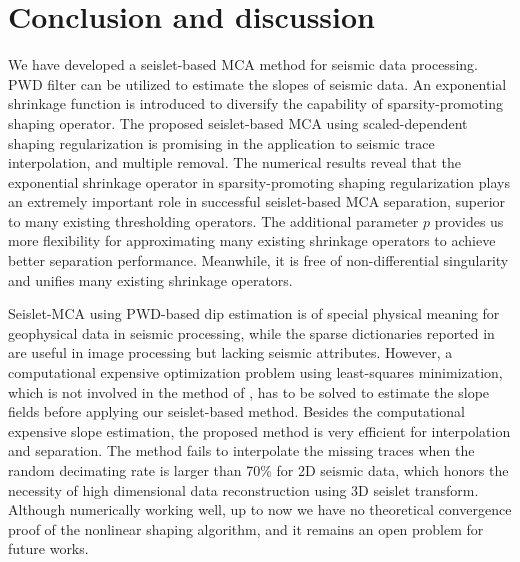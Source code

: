 

  

\section{Conclusion and discussion}

We have developed a seislet-based MCA method for seismic data processing. PWD filter can be utilized to estimate the slopes of seismic data. An exponential shrinkage function is introduced to diversify the capability of sparsity-promoting shaping operator. The proposed seislet-based MCA using scaled-dependent shaping regularization is promising in the application to seismic trace interpolation, and multiple removal. The numerical results reveal that the exponential shrinkage operator in sparsity-promoting shaping regularization plays an extremely important role in successful seislet-based MCA separation, superior to many existing thresholding operators. The additional parameter $p$ provides us more flexibility for approximating many existing shrinkage operators to achieve better separation performance. Meanwhile, it is free of non-differential singularity and unifies many existing shrinkage operators. 

Seislet-MCA using PWD-based dip estimation is of special physical meaning for geophysical data in seismic processing, while the sparse dictionaries reported in \cite{starck2004redundant}  are useful in image processing but lacking seismic attributes. However, a computational expensive optimization problem using least-squares minimization, which is not involved in the method of \cite{starck2004redundant}, has to be solved to estimate the slope fields before applying our seislet-based method. Besides the computational expensive slope estimation, the proposed method is very efficient for interpolation and separation. The method fails to interpolate the missing traces when the random decimating rate is larger than 70\% for 2D seismic data, which honors the necessity of high dimensional data reconstruction using 3D seislet transform. Although numerically working well, up to now we have no theoretical convergence proof of the nonlinear shaping algorithm, and it remains an open problem for future works.

